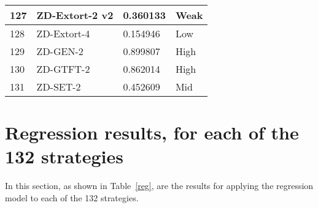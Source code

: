 \begin{longtable}{|p{0.5cm}||p{6cm}||p{4cm}||p{2cm}|}
			127 & ZD-Extort-2 v2              & 0.360133          & Weak     \\ \hline
			128 & ZD-Extort-4                 & 0.154946          & Low      \\ \hline
			129 & ZD-GEN-2                    & 0.899807          & High     \\ \hline
			130 & ZD-GTFT-2                   & 0.862014          & High     \\ \hline
			131 & ZD-SET-2                    & 0.452609          & Mid     \\ \hline
		\end{longtable}

\section{Regression results, for each of the 132 strategies}
\label{append:reg-results-strategies}
In this section, as shown in Table~\ref{reg}, are the results for applying the regression
model to each of the 132 strategies.

